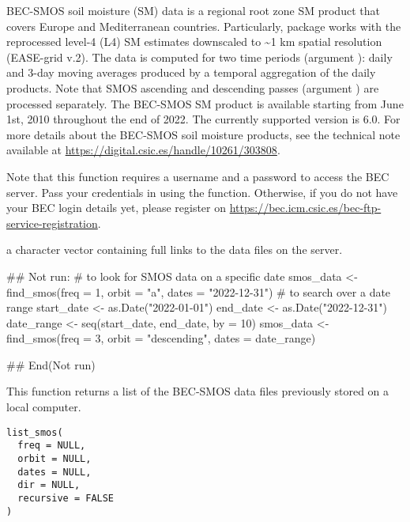\documentclass[a4paper]{book}
\begin{document}
%
\begin{Details}
BEC-SMOS soil moisture (SM) data is a regional root zone SM product that
covers Europe and Mediterranean countries. Particularly,  package
works with the reprocessed level-4 (L4) SM estimates downscaled to \textasciitilde{}1 km
spatial resolution (EASE-grid v.2). The data is computed for two time periods
(argument ): daily and 3-day moving averages produced by a
temporal aggregation of the daily products. Note that SMOS ascending and
descending passes (argument ) are processed separately. The
BEC-SMOS SM product is available starting from June 1st, 2010 throughout the
end of 2022. The currently supported version is 6.0. For more details about
the BEC-SMOS soil moisture products, see the technical note available at
\url{https://digital.csic.es/handle/10261/303808}.

Note that this function requires a username and a password to access the BEC
server. Pass your credentials in using the
 function. Otherwise, if you
do not have your BEC login details yet, please register on
\url{https://bec.icm.csic.es/bec-ftp-service-registration}.
\end{Details}
%
\begin{Value}
a character vector containing full links to the data files on the
server.
\end{Value}
%
\begin{Examples}
\begin{ExampleCode}
## Not run: 
# to look for SMOS data on a specific date
smos_data <- find_smos(freq = 1, orbit = "a", dates = "2022-12-31")
# to search over a date range
start_date <- as.Date("2022-01-01")
end_date <- as.Date("2022-12-31")
date_range <- seq(start_date, end_date, by = 10)
smos_data <- find_smos(freq = 3, orbit = "descending", dates = date_range)

## End(Not run)

\end{ExampleCode}
\end{Examples}
%
\begin{Description}
This function returns a list of the BEC-SMOS data files previously stored on
a local computer.
\end{Description}
%
\begin{Usage}
\begin{verbatim}
list_smos(
  freq = NULL,
  orbit = NULL,
  dates = NULL,
  dir = NULL,
  recursive = FALSE
)
\end{verbatim}
\end{Usage}
\end{document}
